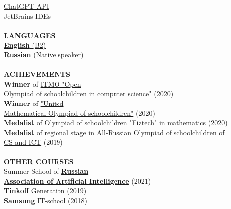 \documentclass{article}
\begin{document}
\begin{vwcol}[widths={0.8,0.2},
 sep=.8cm, justify=flush,rule=0pt,indent=1em]
{\href{https://github.com/NikPeg/ScriboTZ}{ChatGPT API}\\
JetBrains IDEs\\
}
\\
\noindent\textcolor[rgb]{0.1255,0.2902,0.7843}{\textbf{LANGUAGES}}\\
\href{https://nikpeg.github.io/docs/lingvotest.pdf}{\textbf{English} (B2)}\\
\textbf{Russian} (Native speaker)\\
\\
\noindent\textcolor[rgb]{0.1255,0.2902,0.7843}{\textbf{ACHIEVEMENTS}}\\
\textbf{Winner} of \href{https://olymp.itmo.ru/}{ITMO "Open\\ Olympiad of schoolchildren in computer science"} (2020)\\
\textbf{Winner} of \href{https://olympiads.mccme.ru/ommo/23/}{"United\\Mathematical Olympiad of schoolchildren"} (2020)\\
\textbf{Medalist} of \href{https://olymp.mipt.ru/}{Olympiad of schoolchildren "Fiztech" in mathematics} (2020)\\
\textbf{Medalist} of regional stage in \href{https://vos.olimpiada.ru/}{All-Russian Olympiad of schoolchildren of\\
 CS and ICT} (2019)\\
\\
\noindent\textcolor[rgb]{0.1255,0.2902,0.7843}{\textbf{OTHER COURSES}}\\
Summer School of \href{https://raai.space/}{\textbf{Russian\\
Association of Artificial Intelligence}} (2021)\\
\href{https://fintech.tinkoff.ru/school/generation/}{\textbf{Tinkoff} Generation} (2019)\\
\href{https://myitschool.ru/}{\textbf{Samsung} IT-school} (2018)\\
\end{vwcol} 
\end{document}
